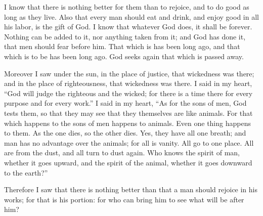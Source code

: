 {I know that there is nothing better for them than to rejoice, and to do good as long as they live.
Also that every man should eat and drink, and enjoy good in all his labor, is the gift of God.
I know that whatever God does, it shall be forever. Nothing can be added to it, nor anything taken from it; and God has done it, that men should fear before him.
That which is has been long ago, and that which is to be has been long ago. God seeks again that which is passed away.
\par }{\PP {}Moreover I saw under the sun, in the place of justice, that wickedness was there; and in the place of righteousness, that wickedness was there.
I said in my heart, “God will judge the righteous and the wicked; for there is a time there for every purpose and for every work.”
I said in my heart, “As for the sons of men, God tests them, so that they may see that they themselves are like animals.
For that which happens to the sons of men happens to animals. Even one thing happens to them. As the one dies, so the other dies. Yes, they have all one breath; and man has no advantage over the animals; for all is vanity.
All go to one place. All are from the dust, and all turn to dust again.
Who knows the spirit of man, whether it goes upward, and the spirit of the animal, whether it goes downward to the earth?”
\par }{\PP {}Therefore I saw that there is nothing better than that a man should rejoice in his works; for that is his portion: for who can bring him to see what will be after him?

}
